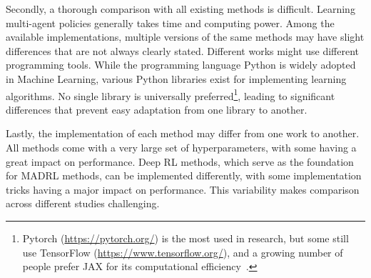 Secondly, a thorough comparison with all existing methods is difficult. Learning multi-agent policies generally takes time and computing power. Among the available implementations, multiple versions of the same methods may have slight differences that are not always clearly stated. Different works might use different programming tools. While the programming language Python is widely adopted in Machine Learning, various Python libraries exist for implementing learning algorithms. No single library is universally preferred\footnote{Pytorch (\url{https://pytorch.org/}) is the most used in research, but some still use TensorFlow (\url{https://www.tensorflow.org/}), and a growing number of people prefer JAX for its computational efficiency~\citep{Jax2018}.}, leading to significant differences that prevent easy adaptation from one library to another. 

Lastly, the implementation of each method may differ from one work to another. All methods come with a very large set of hyperparameters, with some having a great impact on performance. Deep RL methods, which serve as the foundation for MADRL methods, can be implemented differently, with some implementation tricks having a major impact on performance. This variability makes comparison across different studies challenging.

